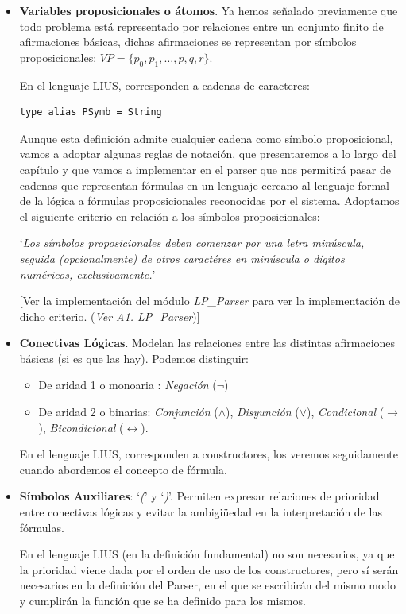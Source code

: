 \documentclass[a4paper]{report}
\begin{document}
\begin{itemize}
\item \textbf{Variables proposicionales o átomos}. Ya hemos señalado previamente que todo problema está representado por relaciones entre un conjunto finito de afirmaciones básicas, dichas afirmaciones se representan por símbolos proposicionales: $VP = \{p_0, p_1, \ldots, p, q, r\}$. 

En el lenguaje LIUS, corresponden a cadenas de caracteres:\\

\begin{lstlisting}[caption={Definición de Símbolo Proposicional como alias de String.}]
type alias PSymb = String 
\end{lstlisting}

Aunque esta definición admite cualquier cadena como símbolo proposicional, vamos a adoptar algunas reglas de notación, que presentaremos a lo largo del capítulo y que vamos a implementar en el parser que nos permitirá pasar de cadenas que representan fórmulas en un lenguaje cercano al lenguaje formal de la lógica a fórmulas proposicionales reconocidas por el sistema. Adoptamos el siguiente criterio en relación a los símbolos proposicionales: 

`\textit{Los símbolos proposicionales deben comenzar por una letra minúscula, seguida (opcionalmente) de otros caractéres en minúscula o dígitos numéricos, exclusivamente.}'

[Ver la implementación del módulo \textit{LP\_Parser} para ver la implementación de dicho criterio. (\hyperref[sec:A1.LPParser]{\textit{\underline{Ver A1. LP\_Parser}}})]

\item \textbf{Conectivas Lógicas}. Modelan las relaciones entre las distintas afirmaciones básicas (si es que las hay). Podemos distinguir:
\begin{itemize}
\item De aridad 1 o monoaria : \textit{Negación} ($\neg$)
\item De aridad 2 o binarias: \textit{Conjunción} ($\wedge$),  \textit{Disyunción} ($\vee$), \textit{Condicional} ($\rightarrow$), \textit{Bicondicional} ($\leftrightarrow$).
\end{itemize}

En el lenguaje LIUS, corresponden a constructores, los veremos seguidamente cuando abordemos el concepto de fórmula.

\item \textbf{Símbolos Auxiliares}: `\textit{(}' y `\textit{)}'. Permiten expresar relaciones de prioridad entre conectivas lógicas y evitar la ambigiüedad en la interpretación de las fórmulas.

En el lenguaje LIUS (en la definición fundamental) no son necesarios, ya que la prioridad viene dada por el orden de uso de los constructores, pero sí serán necesarios en la definición del Parser, en el que se escribirán del mismo modo y cumplirán la función que se ha definido para los mismos. 
\end{itemize}
\end{document}
